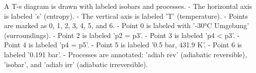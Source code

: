 A T-s diagram is drawn with labeled isobars and processes.  
- The horizontal axis is labeled 's' (entropy).  
- The vertical axis is labeled 'T' (temperature).  
- Points are marked as 0, 1, 2, 3, 4, 5, and 6.  
- Point 0 is labeled with '-30°C Umgebung' (surroundings).  
- Point 2 is labeled 'p2 = p3'.  
- Point 3 is labeled 'p4 < p3'.  
- Point 4 is labeled 'p4 = p5'.  
- Point 5 is labeled '0.5 bar, 431.9 K'.  
- Point 6 is labeled '0.191 bar'.  
- Processes are annotated: 'adiab rev' (adiabatic reversible), 'isobar', and 'adiab irr' (adiabatic irreversible).